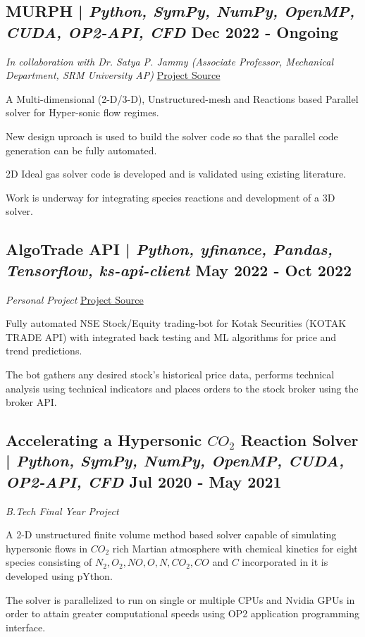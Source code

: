 \subsection{{MURPH | \textit{Python, SymPy, NumPy, OpenMP, CUDA, OP2-API, CFD} \hfill Dec 2022 - Ongoing}}
{\textit{In collaboration with Dr. Satya P. Jammy (Associate Professor, Mechanical Department, SRM University AP)} \hfill \href{https://github.com/UnstructuredFVM}{Project Source}}
\begin{zitemize}
\item {A Multi-dimensional (2-D/3-D), Unstructured-mesh and Reactions based Parallel solver for Hyper-sonic flow regimes.}
\item {New design uproach is used to build the solver code so that the parallel code generation can be fully automated.}
\item {2D Ideal gas solver code is developed and is validated using existing literature.}
\item {Work is underway for integrating species reactions and development of a 3D solver.}
\end{zitemize}


\subsection{{AlgoTrade API | \textit{Python, yfinance, Pandas, Tensorflow, ks-api-client} \hfill May 2022 - Oct 2022}}
{\textit{Personal Project} \hfill \href{https://github.com/vinay-ram1999/AlgoTrade-API}{Project Source}}
\begin{zitemize}
\item {Fully automated NSE Stock/Equity trading-bot for Kotak Securities (KOTAK TRADE API) with integrated back testing and ML algorithms for price and trend predictions.}
\item {The bot gathers any desired stock's historical price data, performs technical analysis using technical indicators and places orders to the stock broker using the broker API.}
\end{zitemize}


\subsection{{Accelerating a Hypersonic $CO_2$ Reaction Solver | \textit{Python, SymPy, NumPy, OpenMP, CUDA, OP2-API, CFD} \hfill Jul 2020 - May 2021}}
{\textit{B.Tech Final Year Project}}
\begin{zitemize}
\item {A 2-D unstructured ﬁnite volume method based solver capable of simulating hypersonic ﬂows in $CO_2$ rich Martian atmosphere with chemical kinetics for eight species consisting of $N_2 , O_2 , NO, O, N, CO_2 , CO$ and $C$ incorporated in it is developed using pYthon.}
\item {The solver is parallelized to run on single or multiple CPUs and Nvidia GPUs in order to attain greater computational speeds using OP2 application programming interface.}
\end{zitemize}

